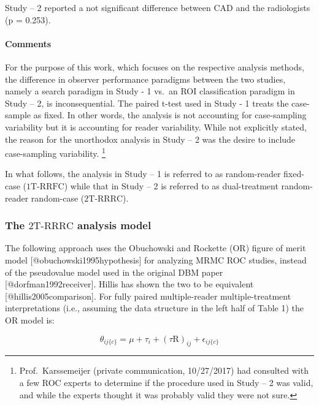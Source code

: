 \documentclass[
]{article}
\begin{document}
Study -- 2 reported a not significant difference between CAD and the radiologists (p = 0.253).

\hypertarget{standalone-cad-radiologists-comments}{%
\paragraph{Comments}\label{standalone-cad-radiologists-comments}}

For the purpose of this work, which focuses on the respective analysis methods, the difference in observer performance paradigms between the two studies, namely a search paradigm in Study - 1 vs.~an ROI classification paradigm in Study -- 2, is inconsequential. The paired t-test used in Study - 1 treats the case-sample as fixed. In other words, the analysis is not accounting for case-sampling variability but it is accounting for reader variability. While not explicitly stated, the reason for the unorthodox analysis in Study -- 2 was the desire to include case-sampling variability. \footnote{Prof.~Karssemeijer (private communication, 10/27/2017) had consulted with a few ROC experts to determine if the procedure used in Study -- 2 was valid, and while the experts thought it was probably valid they were not sure.}

In what follows, the analysis in Study -- 1 is referred to as random-reader fixed-case (\(\text{1T-RRFC}\)) while that in Study -- 2 is referred to as dual-treatment random-reader random-case (\(\text{2T-RRRC}\)).

\hypertarget{standalone-cad-radiologists-2TRRRC-anlaysis}{%
\subsubsection{\texorpdfstring{The \(\text{2T-RRRC}\) analysis model}{The \textbackslash text\{2T-RRRC\} analysis model}}\label{standalone-cad-radiologists-2TRRRC-anlaysis}}

The following approach uses the Obuchowski and Rockette (OR) figure of merit model {[}@obuchowski1995hypothesis{]} for analyzing MRMC ROC studies, instead of the pseudovalue model used in the original DBM paper {[}@dorfman1992receiver{]}. Hillis has shown the two to be equivalent {[}@hillis2005comparison{]}. For fully paired multiple-reader multiple-treatment interpretations (i.e., assuming the data structure in the left half of Table 1) the OR model is:

\begin{equation}
\theta_{ij\{c\}}=\mu+\tau_i+\left ( \tau \text{R} \right )_{ij}+\epsilon_{ij\{c\}}
\label{eq:standalone-cad-model-theta-ij}
\end{equation}
\end{document}
